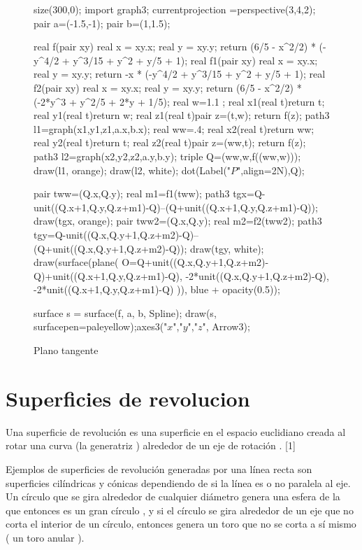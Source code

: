 \begin{figure}[!ht]
	\centering
	\begin{asy}
	size(300,0);
	import graph3;
	currentprojection =perspective(3,4,2);
	pair a=(-1.5,-1);
	pair b=(1,1.5);

	real f(pair xy) {
	real x = xy.x; real y = xy.y;
	return (6/5 - x^2/2) * (-y^4/2 + y^3/15 + y^2 + y/5 + 1);
	}
	real f1(pair xy) {
	real x = xy.x; real y = xy.y;
	return -x * (-y^4/2 + y^3/15 + y^2 + y/5 + 1);
	}
	real f2(pair xy) {
	real x = xy.x; real y = xy.y;
	return (6/5 - x^2/2) * (-2*y^3 + y^2/5 + 2*y + 1/5);
	}
	real w=1.1 ;
	real x1(real t){return t;}
	real y1(real t){return w;}
	real z1(real t){pair z=(t,w); return f(z);}
	path3 l1=graph(x1,y1,z1,a.x,b.x);
	real ww=.4;
	real x2(real t){return ww;}
	real y2(real t){return t;}
	real z2(real t){pair z=(ww,t); return f(z);}
	path3 l2=graph(x2,y2,z2,a.y,b.y);
	triple Q=(ww,w,f((ww,w)));
	draw(l1, orange);
	draw(l2, white);
	dot(Label("$P$",align=2N),Q);

	pair tww=(Q.x,Q.y);
	real m1=f1(tww);
	path3 tgx=Q-unit((Q.x+1,Q.y,Q.z+m1)-Q)--(Q+unit((Q.x+1,Q.y,Q.z+m1)-Q));
	draw(tgx, orange);
	pair tww2=(Q.x,Q.y);
	real m2=f2(tww2);
	path3 tgy=Q-unit((Q.x,Q.y+1,Q.z+m2)-Q)--(Q+unit((Q.x,Q.y+1,Q.z+m2)-Q));
	draw(tgy, white);
	draw(surface(plane(
	O=Q+unit((Q.x,Q.y+1,Q.z+m2)-Q)+unit((Q.x+1,Q.y,Q.z+m1)-Q),
	-2*unit((Q.x,Q.y+1,Q.z+m2)-Q),
	-2*unit((Q.x+1,Q.y,Q.z+m1)-Q)
	)), blue + opacity(0.5));

	surface s = surface(f, a, b, Spline);
	draw(s, surfacepen=paleyellow);axes3("$x$","$y$","$z$", Arrow3);
	\end{asy}
	\caption{Plano tangente}
\end{figure}

\section{Superficies de revolucion}

Una superficie de revolución es una superficie en el espacio euclidiano creada al rotar una curva (la generatriz ) alrededor de un eje de rotación . [1]

Ejemplos de superficies de revolución generadas por una línea recta son superficies cilíndricas y cónicas dependiendo de si la línea es o no paralela al eje. Un círculo que se gira alrededor de cualquier diámetro genera una esfera de la que entonces es un gran círculo , y si el círculo se gira alrededor de un eje que no corta el interior de un círculo, entonces genera un toro que no se corta a sí mismo ( un toro anular ).
